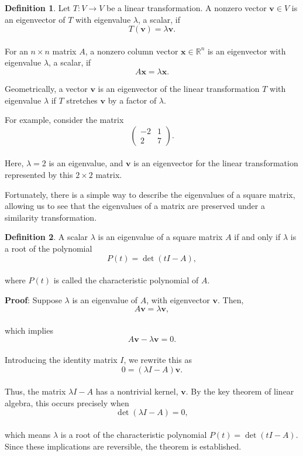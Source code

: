 \documentclass[
]{book}
\theoremstyle{definition}
\newtheorem{definition}{Definition}[chapter]
\theoremstyle{definition}
\theoremstyle{definition}
\theoremstyle{definition}
\theoremstyle{remark}
\begin{document}
\begin{definition}
Let \(T: V \to V\) be a linear transformation. A nonzero vector \(\mathbf{v} \in V\) is an eigenvector of \(T\) with eigenvalue \(\lambda\), a scalar, if\\
\[
T(\mathbf{v}) = \lambda \mathbf{v}.
\]\\
For an \(n \times n\) matrix \(A\), a nonzero column vector \(\mathbf{x} \in \mathbb{R}^n\) is an eigenvector with eigenvalue \(\lambda\), a scalar, if\\
\[
A \mathbf{x} = \lambda \mathbf{x}.
\]
\end{definition}

Geometrically, a vector \(\mathbf{v}\) is an eigenvector of the linear transformation \(T\) with eigenvalue \(\lambda\) if \(T\) stretches \(\mathbf{v}\) by a factor of \(\lambda\).

For example, consider the matrix\\
\[
\begin{pmatrix}
-2 & 1 \\
2 & 7
\end{pmatrix}.
\]\\
Here, \(\lambda = 2\) is an eigenvalue, and \(\mathbf{v}\) is an eigenvector for the linear transformation represented by this \(2 \times 2\) matrix.

Fortunately, there is a simple way to describe the eigenvalues of a square matrix, allowing us to see that the eigenvalues of a matrix are preserved under a similarity transformation.

\begin{definition}
A scalar \(\lambda\) is an eigenvalue of a square matrix \(A\) if and only if \(\lambda\) is a root of the polynomial\\
\[
P(t) = \det(tI - A),
\]\\
where \(P(t)\) is called the characteristic polynomial of \(A\).
\end{definition}

\textbf{Proof}: Suppose \(\lambda\) is an eigenvalue of \(A\), with eigenvector \(\mathbf{v}\). Then,\\
\[
A \mathbf{v} = \lambda \mathbf{v},
\]\\
which implies\\
\[
A \mathbf{v} - \lambda \mathbf{v} = 0.
\]\\
Introducing the identity matrix \(I\), we rewrite this as\\
\[
0 = (\lambda I - A) \mathbf{v}.
\]\\
Thus, the matrix \(\lambda I - A\) has a nontrivial kernel, \(\mathbf{v}\). By the key theorem of linear algebra, this occurs precisely when\\
\[
\det(\lambda I - A) = 0,
\]\\
which means \(\lambda\) is a root of the characteristic polynomial \(P(t) = \det(tI - A)\). Since these implications are reversible, the theorem is established.
\end{document}
